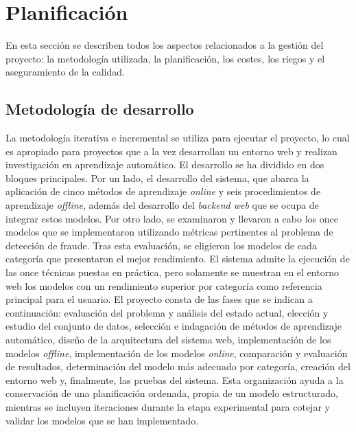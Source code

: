 \documentclass[12pt,a4paper]{report}
\begin{document}
\chapter{Planificación}

\vspace{-1cm}

En esta sección se describen todos los aspectos relacionados a la gestión del proyecto: la metodología utilizada, la planificación, los costes, los riegos y el aseguramiento de la calidad.


\section{Metodología de desarrollo}

La metodología iterativa e incremental se utiliza para ejecutar el proyecto, lo cual es apropiado para proyectos que a la vez desarrollan un entorno web y realizan investigación en aprendizaje automático. El desarrollo se ha dividido en dos bloques principales. Por un lado, el desarrollo del sistema, que abarca la aplicación de cinco métodos de aprendizaje \emph{online} y seis procedimientos de aprendizaje \emph{offline}, además del desarrollo del \emph{backend web} que se ocupa de integrar estos modelos. Por otro lado, se examinaron y llevaron a cabo los once modelos que se implementaron utilizando métricas pertinentes al problema de detección de fraude. Tras esta evaluación, se eligieron los modelos de cada categoría que presentaron el mejor rendimiento. El sistema admite la ejecución de las once técnicas puestas en práctica, pero solamente se muestran en el entorno web los modelos con un rendimiento superior por categoría como referencia principal para el usuario. El proyecto consta de las fases que se indican a continuación: evaluación del problema y análisis del estado actual, elección y estudio del conjunto de datos, selección e indagación de métodos de aprendizaje automático, diseño de la arquitectura del sistema web, implementación de los modelos \emph{offline}, implementación de los modelos \emph{online}, comparación y evaluación de resultados, determinación del modelo más adecuado por categoría, creación del entorno web y, finalmente, las pruebas del sistema. Esta organización ayuda a la conservación de una planificación ordenada, propia de un modelo estructurado, mientras se incluyen iteraciones durante la etapa experimental para cotejar y validar los modelos que se han implementado.
\end{document}
